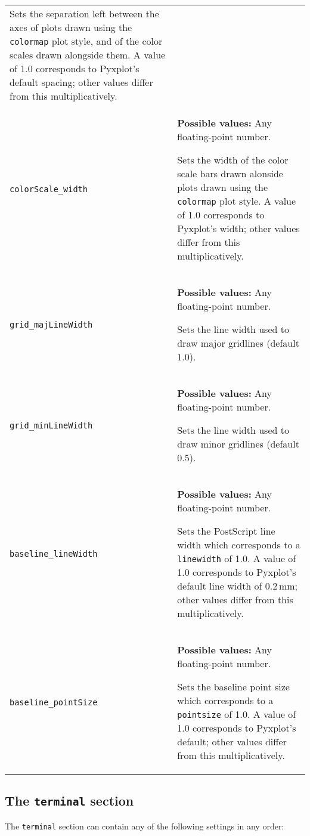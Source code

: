 \begin{longtable}{p{3.4cm}p{9cm}}
               Sets the separation left between the axes of plots drawn using the {\tt colormap} plot style, and of the color scales drawn alongside them. A value of 1.0 corresponds to Pyxplot's default spacing; other values differ from this multiplicatively.
               \\
{\tt colorScale\_width} & {\bf Possible values:} Any floating-point number.

               Sets the width of the color scale bars drawn alonside plots drawn using the {\tt colormap} plot style. A value of 1.0 corresponds to Pyxplot's width; other values differ from this multiplicatively.
               \\
{\tt grid\_majLineWidth} & {\bf Possible values:} Any floating-point number.

               Sets the line width used to draw major gridlines (default $1.0$).
               \\
{\tt grid\_minLineWidth} & {\bf Possible values:} Any floating-point number.

               Sets the line width used to draw minor gridlines (default $0.5$).
               \\
{\tt baseline\_lineWidth} & {\bf Possible values:} Any floating-point number.

               Sets the PostScript line width which corresponds to a {\tt linewidth} of 1.0. A value of 1.0 corresponds to Pyxplot's default line width of $0.2\,\mathrm{mm}$; other values differ from this multiplicatively.
               \\
{\tt baseline\_pointSize} & {\bf Possible values:} Any floating-point number.

               Sets the baseline point size which corresponds to a {\tt pointsize} of 1.0. A value of 1.0 corresponds to Pyxplot's default; other values differ from this multiplicatively.
               \\
\end{longtable}

\subsection{The {\tt terminal} section}
\label{sec:configfile_terminal}

The {\tt terminal} section can contain any of the following settings in any order:

